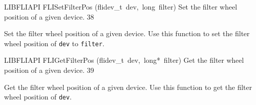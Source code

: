 \documentclass{article}
\begin{document}
\begin{cxxfunction}
{LIBFLIAPI}
        {FLISetFilterPos}
        {(flidev\_t\ dev,\ long\ filter)}
        {
 Set the filter wheel position of a given device.}
        {38}
\begin{cxxdoc}

Set the filter wheel position of a given device.  Use this function
to set the filter wheel position of \texttt{dev} to
\texttt{filter}.


\end{cxxdoc}
\end{cxxfunction}
\begin{cxxfunction}
{LIBFLIAPI}
        {FLIGetFilterPos}
        {(flidev\_t\ dev,\ long*\ filter)}
        {
 Get the filter wheel position of a given device.}
        {39}
\begin{cxxdoc}

Get the filter wheel position of a given device.  Use this function
to get the filter wheel position of \texttt{dev}.


\end{cxxdoc}
\end{cxxfunction}
\end{document}
